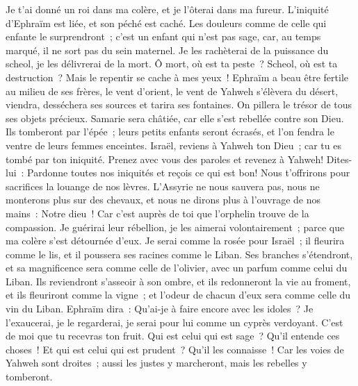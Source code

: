 \begin{multicols}{2}
Je t'ai donné un roi dans ma colère, et je l'ôterai dans ma fureur.
L'iniquité d'Ephraïm est liée, et son péché est caché.
Les douleurs comme de celle qui enfante le surprendront~; c'est un enfant qui n'est pas sage, car, au temps marqué, il ne sort pas du sein maternel.
Je les rachèterai de la puissance du scheol, je les délivrerai de la mort. Ô mort, où est ta peste~? Scheol, où est ta destruction~? Mais le repentir se cache à mes yeux~!
Ephraïm a beau être fertile au milieu de ses frères, le vent d'orient, le vent de Yahweh s'élèvera du désert, viendra, desséchera ses sources et tarira ses fontaines. On pillera le trésor de tous ses objets précieux.
Samarie sera châtiée, car elle s'est rebellée contre son Dieu. Ils tomberont par l'épée~; leurs petits enfants seront écrasés, et l'on fendra le ventre de leurs femmes enceintes.
\VerseOne{}Israël, reviens à Yahweh ton Dieu~; car tu es tombé par ton iniquité.
Prenez avec vous des paroles et revenez à Yahweh! Dites-lui~: Pardonne toutes nos iniquités et reçois ce qui est bon! Nous t'offrirons pour sacrifices la louange de nos lèvres.
L'Assyrie ne nous sauvera pas, nous ne monterons plus sur des chevaux, et nous ne dirons plus à l'ouvrage de nos mains~: Notre dieu~! Car c'est auprès de toi que l'orphelin trouve de la compassion.
Je guérirai leur rébellion, je les aimerai volontairement~; parce que ma colère s'est détournée d'eux.
Je serai comme la rosée pour Israël~; il fleurira comme le lis, et il poussera ses racines comme le Liban.
Ses branches s'étendront, et sa magnificence sera comme celle de l'olivier, avec un parfum comme celui du Liban.
Ils reviendront s'asseoir à son ombre, et ils redonneront la vie au froment, et ils fleuriront comme la vigne~; et l'odeur de chacun d'eux sera comme celle du vin du Liban.
Ephraïm dira~: Qu'ai-je à faire encore avec les idoles~? Je l'exaucerai, je le regarderai, je serai pour lui comme un cyprès verdoyant. C'est de moi que tu recevras ton fruit.
Qui est celui qui est sage~? Qu'il entende ces choses~! Et qui est celui qui est prudent~? Qu'il les connaisse~! Car les voies de Yahweh sont droites~; aussi les justes y marcheront, mais les rebelles y tomberont.
\PPE{}
\end{multicols}
